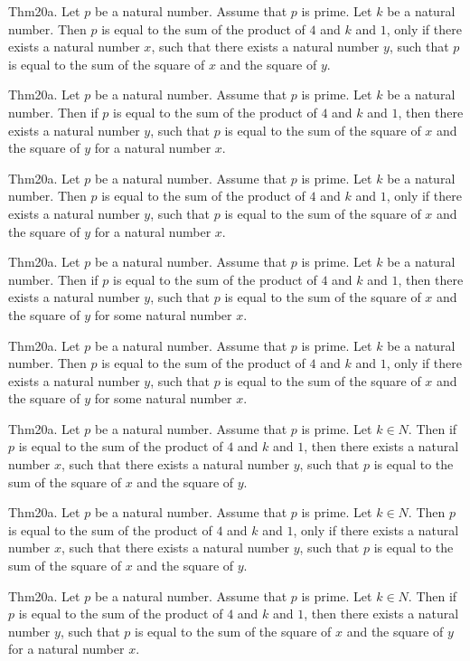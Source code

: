 \documentclass{article}
\begin{document}
Thm20a. Let $p$ be a natural number. Assume that $p$ is prime. Let $k$ be a natural number. Then $p$ is equal to the sum of the product of $4$ and $k$ and $1$, only if there exists a natural number $x$, such that there exists a natural number $y$, such that $p$ is equal to the sum of the square of $x$ and the square of $y$.

Thm20a. Let $p$ be a natural number. Assume that $p$ is prime. Let $k$ be a natural number. Then if $p$ is equal to the sum of the product of $4$ and $k$ and $1$, then there exists a natural number $y$, such that $p$ is equal to the sum of the square of $x$ and the square of $y$ for a natural number $x$.

Thm20a. Let $p$ be a natural number. Assume that $p$ is prime. Let $k$ be a natural number. Then $p$ is equal to the sum of the product of $4$ and $k$ and $1$, only if there exists a natural number $y$, such that $p$ is equal to the sum of the square of $x$ and the square of $y$ for a natural number $x$.

Thm20a. Let $p$ be a natural number. Assume that $p$ is prime. Let $k$ be a natural number. Then if $p$ is equal to the sum of the product of $4$ and $k$ and $1$, then there exists a natural number $y$, such that $p$ is equal to the sum of the square of $x$ and the square of $y$ for some natural number $x$.

Thm20a. Let $p$ be a natural number. Assume that $p$ is prime. Let $k$ be a natural number. Then $p$ is equal to the sum of the product of $4$ and $k$ and $1$, only if there exists a natural number $y$, such that $p$ is equal to the sum of the square of $x$ and the square of $y$ for some natural number $x$.

Thm20a. Let $p$ be a natural number. Assume that $p$ is prime. Let $k \in N$. Then if $p$ is equal to the sum of the product of $4$ and $k$ and $1$, then there exists a natural number $x$, such that there exists a natural number $y$, such that $p$ is equal to the sum of the square of $x$ and the square of $y$.

Thm20a. Let $p$ be a natural number. Assume that $p$ is prime. Let $k \in N$. Then $p$ is equal to the sum of the product of $4$ and $k$ and $1$, only if there exists a natural number $x$, such that there exists a natural number $y$, such that $p$ is equal to the sum of the square of $x$ and the square of $y$.

Thm20a. Let $p$ be a natural number. Assume that $p$ is prime. Let $k \in N$. Then if $p$ is equal to the sum of the product of $4$ and $k$ and $1$, then there exists a natural number $y$, such that $p$ is equal to the sum of the square of $x$ and the square of $y$ for a natural number $x$.
\end{document}

